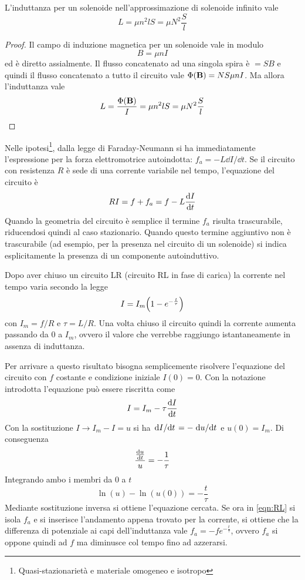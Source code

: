 \begin{obs}
    L'induttanza per un solenoide nell'approssimazione di solenoide infinito vale
    \[
        L=\mu n^2 lS=\mu N^2 \frac{S}{l}
    \]
\end{obs}
\begin{proof}
    Il campo di induzione magnetica per un solenoide vale in modulo
    \[
        B=\mu nI
    \]
    ed è diretto assialmente. Il flusso concatenato ad una singola spira è $=SB$
    e quindi il flusso concatenato a tutto il circuito vale $\Phi(\vb{B})=NS\mu nI$.
    Ma allora l'induttanza vale
    \[
        L=\frac{\Phi(\vb{B})}{I}=\mu n^2 lS=\mu N^2 \frac{S}{l}
    \]
\end{proof}
Nelle ipotesi\footnote{Quasi-stazionarietà e materiale omogeneo e isotropo}, dalla legge di Faraday-Neumann si ha immediatamente
l'espressione per la forza elettromotrice autoindotta: $f_a=-L\dd{I}/\dd{t}$.
Se il circuito con resistenza $R$ è sede di una corrente variabile nel tempo, l'equazione del circuito è
\begin{equation}
    \label{eqn:RL}
    RI=f+f_a=f-L\dv{I}{t}
\end{equation}
Quando la geometria del circuito è semplice il termine $f_a$ risulta trascurabile, riducendosi quindi al caso stazionario.
Quando questo termine aggiuntivo non è trascurabile (ad esempio, per la presenza nel circuito di un solenoide) si indica
esplicitamente la presenza di un componente autoinduttivo.
\begin{example}
    Dopo aver chiuso  un circuito LR (circuito RL in fase di carica) la corrente nel tempo varia secondo la legge
    \[
        I=I_m\Bigl(1-e^{-\frac{t}{\tau}}\Bigr)
    \]
    con $I_m=f/R$ e $\tau=L/R$.
    Una volta chiuso il circuito quindi la corrente aumenta passando da $0$ a $I_m$, ovvero il valore
    che verrebbe raggiungo istantaneamente in assenza di induttanza.

    Per arrivare a questo risultato bisogna semplicemente risolvere l'equazione del circuito con $f$ costante
    e condizione iniziale $I(0)=0$.
    Con la notazione introdotta l'equazione può essere riscritta come
    \[
        I=I_m-\tau \dv{I}{t}
    \]
    Con la sostituzione $I\rightarrow I_m-I=u$ si ha $\dv*{I}{t}=-\dv*{u}{t}$ e $u(0)=I_m$. Di conseguenza
    \[
        \frac{\dv{u}{t}}{u}=-\frac{1}{\tau}
    \]
    Integrando ambo i membri da $0$ a $t$
    \[
        \ln(u)-\ln(u(0))=-\frac{t}{\tau}
    \]
    Mediante sostituzione inversa si ottiene l'equazione cercata.
    Se ora in \eqref{eqn:RL} si isola $f_a$ e si inserisce l'andamento appena trovato per la corrente, si ottiene che
    la differenza di potenziale ai capi dell'induttanza vale $f_a=-fe^{-\frac{t}{\tau}}$, ovvero
    $f_a$ si oppone quindi ad $f$ ma diminusce col tempo fino ad azzerarsi.
\end{example}

